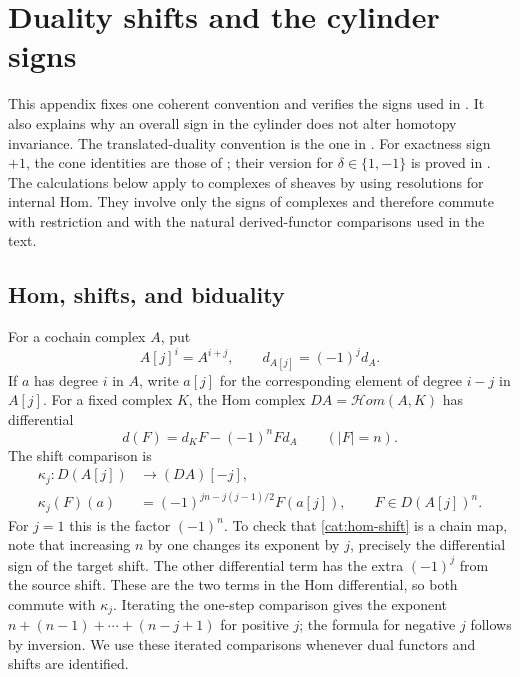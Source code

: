 \section{Duality shifts and the cylinder signs}
\label{app:duality-signs}

This appendix fixes one coherent convention and verifies the signs used
in .  It also explains why an
overall sign in the cylinder does not alter homotopy invariance.  The
translated-duality convention is the one in
\cite[\S2.1]{Woolf2008}.  For exactness sign $+1$, the cone identities
are those of \cite[Lemma~2.1]{Woolf2008}; their version for
$\delta\in\{1,-1\}$ is proved in .
The calculations below apply to complexes
of sheaves by using resolutions for internal Hom.  They involve only
the signs of complexes and therefore commute with restriction and with
the natural derived-functor comparisons used in the text.

\subsection{Hom, shifts, and biduality}

For a cochain complex $A$, put
\[
 A[j]^i=A^{i+j},\qquad d_{A[j]}=(-1)^j d_A.
\]
If $a$ has degree $i$ in $A$, write $a[j]$ for the corresponding element
of degree $i-j$ in $A[j]$.  For a fixed complex $K$, the Hom complex
$D A=\mathcal Hom(A,K)$ has differential
\[
 d(F)=d_KF-(-1)^nFd_A\qquad(|F|=n).
\]
The shift comparison is
\begin{equation}
 \label{cat:hom-shift}
 \begin{split}
 \kappa_j:D(A[j])&\longrightarrow(DA)[-j],\\
 \kappa_j(F)(a)&=(-1)^{jn-j(j-1)/2}F(a[j]),
 \qquad F\in D(A[j])^n.
 \end{split}
\end{equation}
For $j=1$ this is the factor $(-1)^n$.  To check that
\eqref{cat:hom-shift} is a chain map, note that increasing $n$ by one
changes its exponent by $j$, precisely the differential sign of the
target shift.  The other differential term has the extra $(-1)^j$
from the source shift.  These are the two terms in the Hom
differential, so both commute with $\kappa_j$.  Iterating the
one-step comparison gives the exponent
$n+(n-1)+\cdots+(n-j+1)$ for positive $j$; the formula for negative
$j$ follows by inversion.  We use these iterated comparisons whenever
dual functors and shifts are identified.

